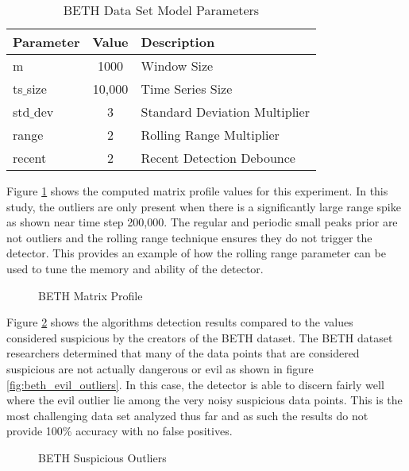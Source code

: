 \begin{table}[H]
\centering
\begin{tabular}{|l|c|l|}
    \hline
	\textbf{Parameter} & \textbf{Value} & \textbf{Description} \\ \hline
	m & 1000 & Window Size \\ \hline
	ts$\_$size & 10,000 & Time Series Size \\ \hline
	std$\_$dev & 3 & Standard Deviation Multiplier \\ \hline
	range & 2 & Rolling Range Multiplier\\ \hline
	recent & 2 & Recent Detection Debounce\\ \hline
\end{tabular}
\caption{BETH Data Set Model Parameters}
\label{tab:beth_sim_params}
\end{table}

Figure \ref{fig:beth_mp_hist} shows the computed matrix profile values for this experiment. In this study, the outliers are only present when there is a significantly large range spike as shown near time step 200,000. The regular and periodic small peaks prior are not outliers and the rolling range technique ensures they do not trigger the detector. This provides an example of how the rolling range parameter can be used to tune the memory and ability of the detector. 

\begin{figure}[H]
    \centering
    
    \caption{BETH Matrix Profile}
    \label{fig:beth_mp_hist}
\end{figure}

Figure \ref{fig:beth_sus_outliers} shows the algorithms detection results compared to the values considered suspicious by the creators of the BETH dataset. The BETH dataset researchers determined that many of the data points that are considered suspicious are not actually dangerous or evil as shown in figure \ref{fig:beth_evil_outliers}. In this case, the detector is able to discern fairly well where the evil outlier lie among the very noisy suspicious data points. This is the most challenging data set analyzed thus far and as such the results do not provide 100\% accuracy with no false positives.

 \begin{figure}[H]
    \centering
    
    \caption{BETH Suspicious Outliers}
    \label{fig:beth_sus_outliers}
\end{figure}

